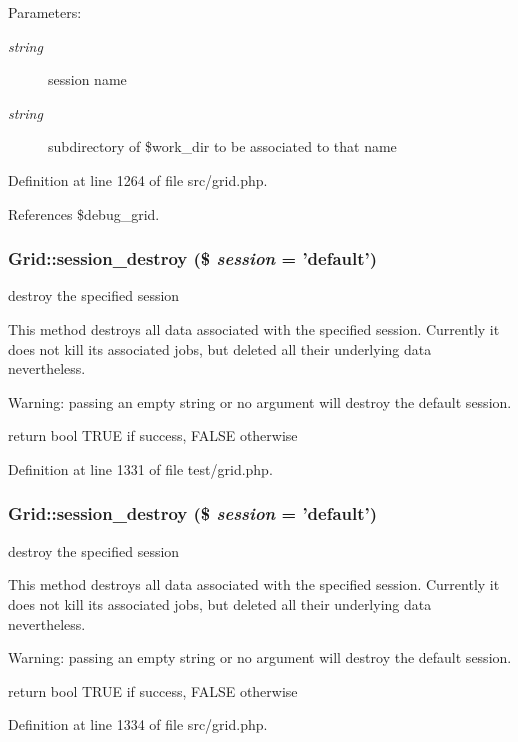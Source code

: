 \begin{Desc}
\item[Parameters:]
\begin{description}
\item[{\em string}]session name \item[{\em string}]subdirectory of \$work\_\-dir to be associated to that name \end{description}
\end{Desc}


Definition at line 1264 of file src/grid.php.

References \$debug\_\-grid.
\subsubsection{\setlength{\rightskip}{0pt plus 5cm}Grid::session\_\-destroy (\$ {\em session} = 'default')}\label{classGrid_a44}


destroy the specified session 

This method destroys all data associated with the specified session. Currently it does not kill its associated jobs, but deleted all their underlying data nevertheless.

Warning: passing an empty string or no argument will destroy the default session.

return bool TRUE if success, FALSE otherwise 

Definition at line 1331 of file test/grid.php.
\subsubsection{\setlength{\rightskip}{0pt plus 5cm}Grid::session\_\-destroy (\$ {\em session} = 'default')}\label{classGrid_a18}


destroy the specified session 

This method destroys all data associated with the specified session. Currently it does not kill its associated jobs, but deleted all their underlying data nevertheless.

Warning: passing an empty string or no argument will destroy the default session.

return bool TRUE if success, FALSE otherwise 

Definition at line 1334 of file src/grid.php.
